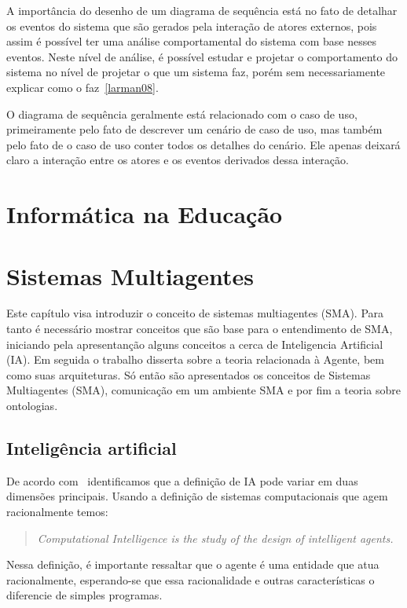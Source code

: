 A importância do desenho de um diagrama de sequência está no fato de detalhar os eventos do sistema que são gerados pela interação de atores externos, pois assim é possível ter uma análise comportamental do sistema com base nesses eventos. Neste nível de análise, é possível estudar e projetar o comportamento do sistema no nível de projetar o que um sistema faz, porém sem necessariamente explicar como o faz~\ref{larman08}.

O diagrama de sequência geralmente está relacionado com o caso de uso, primeiramente pelo fato de descrever um cenário de caso de uso, mas também pelo fato de o caso de uso conter todos os detalhes do cenário. Ele apenas deixará claro a interação entre os atores e os eventos derivados dessa interação.

\section{Informática na Educação}

\section{Sistemas Multiagentes}

Este capítulo visa introduzir o conceito de sistemas multiagentes (SMA). Para tanto é necessário mostrar conceitos que são base para o entendimento de SMA, iniciando pela apresentanção alguns conceitos a cerca de Inteligencia Artificial (IA). Em seguida o trabalho disserta sobre a teoria relacionada à Agente, bem como suas arquiteturas. Só então são apresentados os conceitos de Sistemas Multiagentes (SMA), comunicação em um ambiente SMA e por fim a teoria sobre ontologias.

\subsection{Inteligência artificial}

De acordo com~\cite{poole98} identificamos que a definição de IA pode variar em duas dimensões principais. Usando a definição de sistemas computacionais que agem racionalmente temos:

\begin{quote}
\emph{Computational Intelligence is the study of the design of intelligent agents.}
\end{quote}

Nessa definição, é importante ressaltar que o agente é uma entidade que atua racionalmente, esperando-se que essa racionalidade e outras características o diferencie de simples programas.

